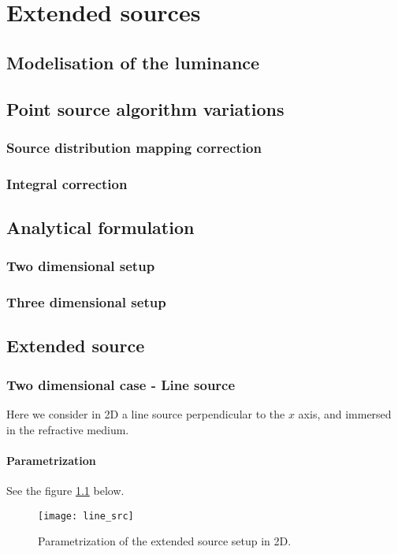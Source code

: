 \chapter{Extended sources}
\label{ch:extended}

\section{Modelisation of the luminance}

\section{Point source algorithm variations}
\subsection{Source distribution mapping correction}
\subsection{Integral correction}

\section{Analytical formulation}
\subsection{Two dimensional setup}


\subsection{Three dimensional setup}


\section{Extended source}
\subsection{Two dimensional case - Line source}
Here we consider in 2D a line source perpendicular to the $x$ axis,
and immersed in the refractive medium. 
\subsubsection*{Parametrization}
See the figure \ref{fig:line_src} below.

\begin{figure}[!htbp]
\centering
\texttt{[image: line\_src]} 
\caption{Parametrization of the extended source setup in 2D.
}
\label{fig:line_src}

\end{figure}


